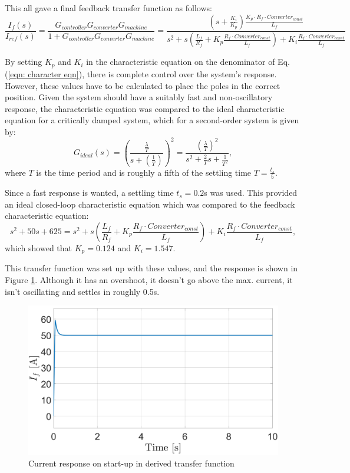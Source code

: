             This all gave a final feedback transfer function as follows:
            \begin{equation}
                \frac{I_f(s)}{I_{ref}(s)} = \frac{G_{controller}G_{converter}G_{machine}}{1+G_{controller}G_{converter}G_{machine}} = \frac{\left(s+\frac{K_i}{K_p}\right)\frac{K_p \cdot R_f \cdot Converter_{const}}{L_f}}{s^2+s\left(\frac{L_f}{R_f} + K_p\frac{R_f \cdot Converter_{const}}{L_f}\right) + K_i\frac{R_f \cdot Converter_{const}}{L_f}} \label{eqn: character eqn}
            \end{equation}

            By setting \(K_p\) and \(K_i\) in the characteristic equation on the denominator of Eq. (\ref{eqn: character eqn}), there is complete control over the system's response. However, these values have to be calculated to place the poles in the correct position. Given the system should have a suitably fast and non-oscillatory response, the characteristic equation was compared to the ideal characteristic equation for a critically damped system, which for a second-order system is given by:
            \begin{equation}
                G_{ideal}(s) = \left(\frac{\frac{\lambda}{T}}{s+\left(\frac{1}{T}\right)}\right)^2 = \frac{\left(\frac{\lambda}{T}\right)^2}{s^2+\frac{2}{T}s + \frac{1}{T^2}}, \label{ideal sys}
            \end{equation}
            where \(T\) is the time period and is roughly a fifth of the settling time \(T = \frac{t_s}{5}\).

            Since a fast response is wanted, a settling time \(t_s = 0.2\)s was used. This provided an ideal closed-loop characteristic equation which was compared to the feedback characteristic equation:
            \begin{equation}
                s^2 + 50s + 625 = s^2+s\left(\frac{L_f}{R_f} + K_p\frac{R_f \cdot Converter_{const}}{L_f}\right) + K_i\frac{R_f \cdot Converter_{const}}{L_f},
            \end{equation}
            which showed that \(K_p = 0.124\) and \(K_i = 1.547\).

            This transfer function was set up with these values, and the response is shown in Figure \ref{fig: current resp}. Although it has an overshoot, it doesn't go above the max. current, it isn't oscillating and settles in roughly 0.5s.
            \begin{figure}[tbh!]
            \centering
            \includegraphics[width=0.6\linewidth]{PEMDT Exam Report/img/current response.jpg}
            \caption{Current response on start-up in derived transfer function}
            \label{fig: current resp}
        \end{figure}

